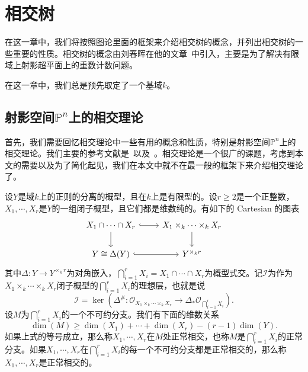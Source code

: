 \chapter{相交树}
\label{chapter:geometric}
在这一章中，我们将按照图论里面的框架来介绍相交树的概念，并列出相交树的一些重要的性质。相交树的概念由刘春晖在他的文章~中引入，主要是为了解决有限域上射影超平面上的重数计数问题。

在这一章中，我们总是预先取定了一个基域$k$。

\section{射影空间$\mathbb{P}^n$上的相交理论}
\label{subsection_intersection_theory}

首先，我们需要回忆相交理论中一些有用的概念和性质，特别是射影空间$\mathbb{P}^n$上的相交理论。我们主要的参考文献是~以及~。相交理论是一个很广的课题，考虑到本文的需要以及为了简化起见，我们在本文中就不在最一般的框架下来介绍相交理论了。

设$Y$是域$k$上的正则的分离的概型，且在$k$上是有限型的。设$r \geqslant 2$是一个正整数，$X_1,\cdots, X_r$是$Y$的一组闭子概型，且它们都是维数纯的。有如下的 Cartesian 的图表
\begin{equation}
\begin{tikzcd}
X_1 \cap\cdots\cap X_r \arrow[r, hookrightarrow] \arrow[d] & X_1\times_k\cdots\times_k X_r \arrow[d] \\
Y\cong \Delta(Y) \arrow[r, hookrightarrow] & Y^{\times_k r}
\end{tikzcd}
\end{equation}
其中$\Delta: Y \to Y^{\times_k r}$为对角嵌入，$\bigcap\limits_{i=1}^r X_i =  X_1 \cap\cdots\cap X_r$为概型式交。记$\mathscr{I}$为作为$X_1\times_k\cdots\times_k X_r$闭子概型的$\bigcap\limits_{i=1}^r X_i$的理想层，也就是说
\begin{equation}
\mathscr{I} = \ker(\Delta^{\#}: \mathcal{O}_{X_1\times_k\cdots\times_k X_r} \to \Delta_{\ast} \mathcal{O}_{\bigcap\limits_{i=1}^r X_i}).
\end{equation}
设$M$为$\bigcap\limits_{i=1}^r X_i$的一个不可约分支。我们有下面的维数关系
\begin{equation}
\dim(M) \geqslant \dim(X_1) + \cdots + \dim(X_r) - (r-1)\dim(Y).
\end{equation}
如果上式的等号成立，那么称$X_1,\cdots, X_r$在$M$处正常相交，也称$M$是$\bigcap\limits_{i=1}^r X_i$的正常分支。如果$X_1,\cdots, X_r$在$\bigcap\limits_{i=1}^r X_i$的每一个不可约分支都是正常相交的，那么称$X_1,\cdots, X_r$是正常相交的。

